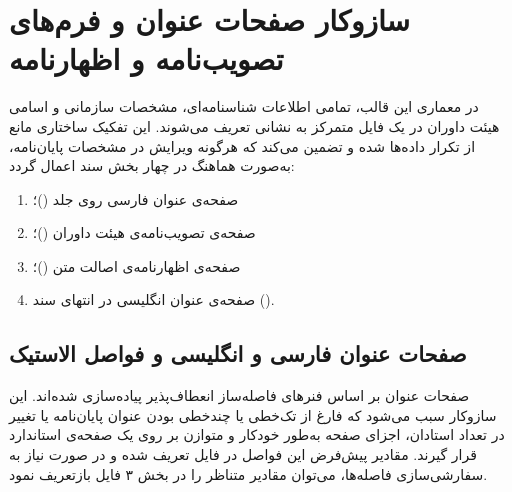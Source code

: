 

\section{سازوکار صفحات عنوان و فرم‌های تصویب‌نامه و اظهارنامه}\label{sec:app_title_and_forms}

در معماری این قالب، تمامی اطلاعات شناسنامه‌ای، مشخصات سازمانی و اسامی هیئت داوران در یک فایل متمرکز به نشانی  تعریف می‌شوند. این تفکیک ساختاری مانع از تکرار داده‌ها شده و تضمین می‌کند که هرگونه ویرایش در مشخصات پایان‌نامه، به‌صورت هماهنگ در چهار بخش سند اعمال گردد:
\begin{enumerate}
    \item صفحه‌ی عنوان فارسی روی جلد ()؛
    \vspace{-0.25cm}
    \item صفحه‌ی تصویب‌نامه‌ی هیئت داوران ()؛
    \vspace{-0.25cm}
    \item صفحه‌ی اظهارنامه‌ی اصالت متن ()؛
    \vspace{-0.25cm}
    \item صفحه‌ی عنوان انگلیسی در انتهای سند ().
\end{enumerate}


\subsection{صفحات عنوان فارسی و انگلیسی و فواصل الاستیک}

صفحات عنوان بر اساس فنرهای فاصله‌ساز انعطاف‌پذیر پیاده‌سازی شده‌اند. این سازوکار سبب می‌شود که فارغ از تک‌خطی یا چندخطی بودن عنوان پایان‌نامه یا تغییر در تعداد استادان، اجزای صفحه به‌طور خودکار و متوازن بر روی یک صفحه‌ی استاندارد  قرار گیرند. مقادیر پیش‌فرض این فواصل در فایل  تعریف شده و در صورت نیاز به سفارشی‌سازی فاصله‌ها، می‌توان مقادیر متناظر را در بخش ۳ فایل  بازتعریف نمود.


